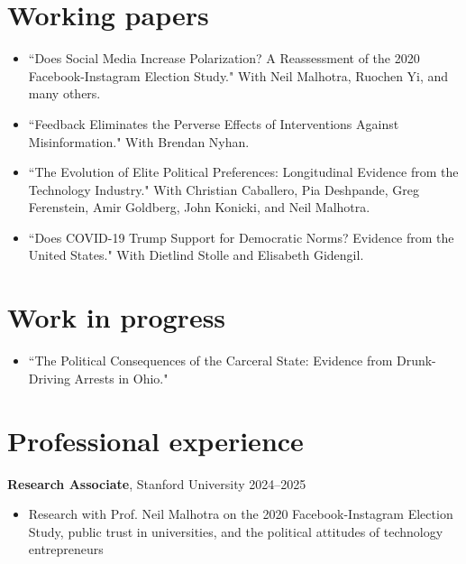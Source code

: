 \documentclass[margin, 10pt]{res}
\begin{document}
\begin{resume}
\begin{itemize}
\end{itemize}

\section{Working papers}
\begin{itemize}

	\item ``Does Social Media Increase Polarization? A Reassessment of the 2020 Facebook-Instagram Election Study." With Neil Malhotra, Ruochen Yi, and many others.

	\item ``Feedback Eliminates the Perverse Effects of Interventions Against Misinformation." With Brendan Nyhan.

	\item ``The Evolution of Elite Political Preferences: Longitudinal Evidence from the Technology Industry." With Christian Caballero, Pia Deshpande, Greg Ferenstein, Amir Goldberg, John Konicki, and Neil Malhotra.

	\item ``Does COVID-19 Trump Support for Democratic Norms? Evidence from the United States." With Dietlind Stolle and Elisabeth Gidengil.

\end{itemize}

\section{Work in progress}
\begin{itemize}

	\item ``The Political Consequences of the Carceral State: Evidence from Drunk-Driving Arrests in Ohio."

\end{itemize}

\section{Professional experience}

\textbf{Research Associate}, Stanford University \hspace*{0pt}\hfill 2024--2025
\begin{itemize}
	\item Research with Prof. Neil Malhotra on the 2020 Facebook-Instagram Election Study, public trust in universities, and the political attitudes of technology entrepreneurs
\end{itemize}


\end{resume}
\end{document}
